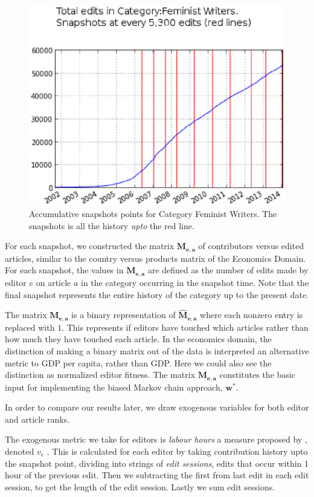 \begin{figure}[!t]
\centering
\includegraphics[width=0.9\columnwidth]{Figures/cumulative_snapshots_Feminist_Writers.eps}
\caption{Accumulative snapshots points for Category Feminist Writers. The snapshots is all the history {\it upto} the red line.}
\label{fig:accumulative_snapshots}
\end{figure}

For each snapshot, we constructed the matrix $\mathbf{M_{e,a}}$ of contributors versus edited articles, similar to the country versus products matrix of the Economics Domain. For each snapshot, the values in $\mathbf{M_{e,a}}$ are defined as the number of edits made by editor $e$ on article $a$ in the category occurring in the snapshot time. Note that the final snapshot represents the entire history of the category up to the present date.
  
The matrix $\mathbf{M_{e,a}}$ is a binary representation of $\mathbf{\hat{M}_{e,a}}$ where each nonzero entry is replaced with $1$. This represents if editors have touched which articles rather than how much they have touched each article. In the economics domain, the distinction of making a binary matrix out of the data is interpreted an alternative metric to GDP per capita, rather than GDP. Here we could also see the distinction as normalized editor fitness. The matrix $\mathbf{M_{e,a}}$ constitutes the basic input for implementing the biased Markov chain approach, $\mathbf{w^*}$.

In order to compare our results later, we draw exogenous variables for both editor and article ranks.

The exogenous metric we take for editors is {\it labour hours} a measure proposed by \cite{geiger2013}, denoted $v_e$ . 
This is calculated for each editor by taking contribution history upto the snapshot point, dividing into strings of {\it edit sessions}, edits that occur within 1 hour of the previous edit. Then we subtracting the first from last edit in each edit session, to get the length of the edit session. Lastly we sum edit sessions. 

